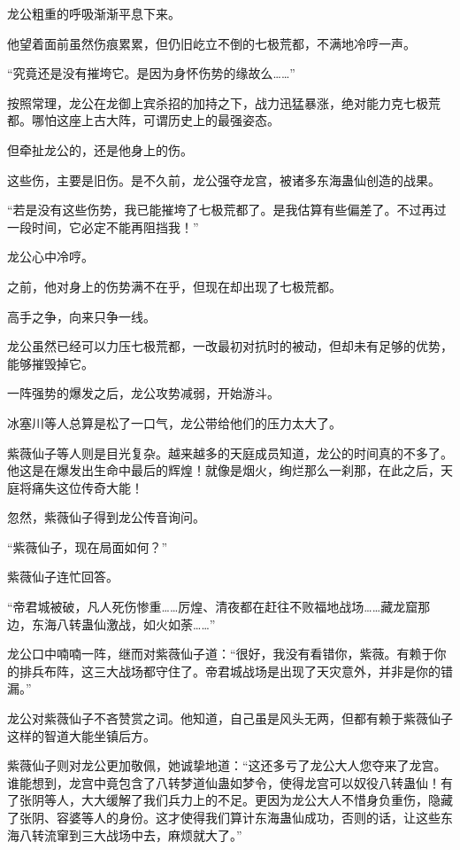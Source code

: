 \begin{this_body}
龙公粗重的呼吸渐渐平息下来。

他望着面前虽然伤痕累累，但仍旧屹立不倒的七极荒都，不满地冷哼一声。

“究竟还是没有摧垮它。是因为身怀伤势的缘故么……”

按照常理，龙公在龙御上宾杀招的加持之下，战力迅猛暴涨，绝对能力克七极荒都。哪怕这座上古大阵，可谓历史上的最强姿态。

但牵扯龙公的，还是他身上的伤。

这些伤，主要是旧伤。是不久前，龙公强夺龙宫，被诸多东海蛊仙创造的战果。

“若是没有这些伤势，我已能摧垮了七极荒都了。是我估算有些偏差了。不过再过一段时间，它必定不能再阻挡我！”

龙公心中冷哼。

之前，他对身上的伤势满不在乎，但现在却出现了七极荒都。

高手之争，向来只争一线。

龙公虽然已经可以力压七极荒都，一改最初对抗时的被动，但却未有足够的优势，能够摧毁掉它。

一阵强势的爆发之后，龙公攻势减弱，开始游斗。

冰塞川等人总算是松了一口气，龙公带给他们的压力太大了。

紫薇仙子等人则是目光复杂。越来越多的天庭成员知道，龙公的时间真的不多了。他这是在爆发出生命中最后的辉煌！就像是烟火，绚烂那么一刹那，在此之后，天庭将痛失这位传奇大能！

忽然，紫薇仙子得到龙公传音询问。

“紫薇仙子，现在局面如何？”

紫薇仙子连忙回答。

“帝君城被破，凡人死伤惨重……厉煌、清夜都在赶往不败福地战场……藏龙窟那边，东海八转蛊仙激战，如火如荼……”

龙公口中喃喃一阵，继而对紫薇仙子道：“很好，我没有看错你，紫薇。有赖于你的排兵布阵，这三大战场都守住了。帝君城战场是出现了天灾意外，并非是你的错漏。”

龙公对紫薇仙子不吝赞赏之词。他知道，自己虽是风头无两，但都有赖于紫薇仙子这样的智道大能坐镇后方。

紫薇仙子则对龙公更加敬佩，她诚挚地道：“这还多亏了龙公大人您夺来了龙宫。谁能想到，龙宫中竟包含了八转梦道仙蛊如梦令，使得龙宫可以奴役八转蛊仙！有了张阴等人，大大缓解了我们兵力上的不足。更因为龙公大人不惜身负重伤，隐藏了张阴、容婆等人的身份。这才使得我们算计东海蛊仙成功，否则的话，让这些东海八转流窜到三大战场中去，麻烦就大了。”


\end{this_body}
